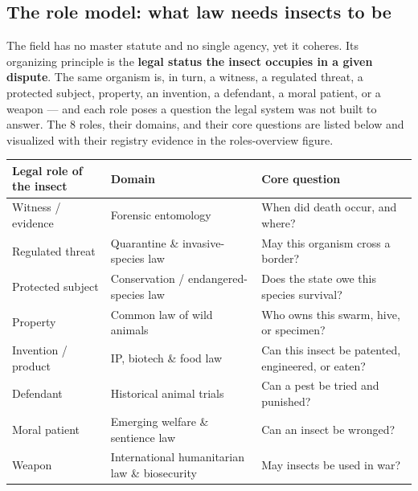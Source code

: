 \documentclass[
  english,
]{article}
\newcounter{none} %
\begin{document}
\subsection{The role model: what law needs insects to
be}\label{the-role-model-what-law-needs-insects-to-be}

The field has no master statute and no single agency, yet it coheres.
Its organizing principle is the \textbf{legal status the insect occupies
in a given dispute}. The same organism is, in turn, a witness, a
regulated threat, a protected subject, property, an invention, a
defendant, a moral patient, or a weapon --- and each role poses a
question the legal system was not built to answer. The 8 roles, their
domains, and their core questions are listed below and visualized with
their registry evidence in the roles-overview figure.

{\def\LTcaptype{none} %
\begin{longtable}[]{@{}
  >{\raggedright\arraybackslash}p{}
  >{\raggedright\arraybackslash}p{}
  >{\raggedright\arraybackslash}p{}@{}}
\toprule\noalign{}
\begin{minipage}[b]{\linewidth}\raggedright
Legal role of the insect
\end{minipage} & \begin{minipage}[b]{\linewidth}\raggedright
Domain
\end{minipage} & \begin{minipage}[b]{\linewidth}\raggedright
Core question
\end{minipage} \\
\midrule\noalign{}
\endhead
\bottomrule\noalign{}
\endlastfoot
Witness / evidence & Forensic entomology & When did death occur, and
where? \\
Regulated threat & Quarantine \& invasive-species law & May this
organism cross a border? \\
Protected subject & Conservation / endangered-species law & Does the
state owe this species survival? \\
Property & Common law of wild animals & Who owns this swarm, hive, or
specimen? \\
Invention / product & IP, biotech \& food law & Can this insect be
patented, engineered, or eaten? \\
Defendant & Historical animal trials & Can a pest be tried and
punished? \\
Moral patient & Emerging welfare \& sentience law & Can an insect be
wronged? \\
Weapon & International humanitarian law \& biosecurity & May insects be
used in war? \\
\end{longtable}
}
\end{document}
